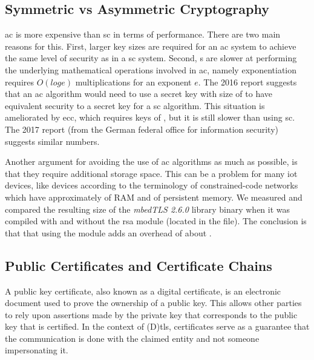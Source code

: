 \documentclass{llncs}
\begin{document}
\subsection{Symmetric vs Asymmetric Cryptography} \label{sac}

\gls{ac} is more expensive than \gls{sc} in terms of performance. There are two main reasons for this. First, larger key sizes are required for an \gls{ac} system to achieve the
same level of security as in a \gls{sc} system. Second, s are slower at performing the underlying
mathematical operations involved in \gls{ac}, namely exponentiation requires
$O(log e)$ multiplications for an exponent $e$. The 2016  report \cite{Recommen44:online}
suggests that an \gls{ac} algorithm would need to use a secret key with size of 
to have equivalent security to a  secret key for a \gls{sc} algorithm.
This situation is ameliorated by \gls{ecc}, which requires keys of , but
it is still slower than using \gls{sc}. The 2017  report \cite{Kryptogr1:online} (from the
German federal office for information security) suggests similar numbers.

Another argument for avoiding the use of \gls{ac}
algorithms as much as possible, is that they require additional storage space. This can be a problem for many \gls{iot} devices,
like  devices according to the terminology of constrained-code
networks\cite{RFC7228} which have approximately  of RAM and 
of persistent memory. We measured and compared the resulting size of the \textit{mbedTLS 2.6.0} library\cite{SSLLibra13:online} binary when it was compiled with and without the \gls{rsa} module
(located in the  file). The conclusion is that that using the  module adds an overhead of about .

\subsection{Public Certificates and Certificate Chains} \label{pccc}

A public key certificate, also known as a digital certificate, is an electronic
document used to prove the ownership of a public key. This allows other parties
to rely upon assertions made by the private key that corresponds to the public key
that is certified. In the context of (D)\gls{tls}, certificates serve as a guarantee
that the communication is done with the claimed entity and not someone impersonating it.
\end{document}
